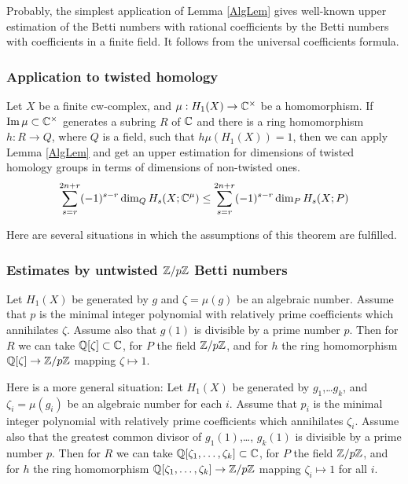 \documentclass{article}
\numberwithin{equation}{section}
\begin{document}
Probably, the simplest application of Lemma \ref{AlgLem} gives
well-known upper estimation of the Betti numbers with rational
coefficients by the Betti numbers with coefficients in a finite field. 
It follows from the universal coefficients formula. 

\subsubsection{Application to twisted homology}\label{sT.3.3} 
\begin{ATh}\label{EstTwHom}
Let $X$ be a finite cw-complex, and $\mu:H_1(X)\to\mathbb C^\times$ be a
homomorphism. If $\operatorname{Im}\mu\subset\mathbb C^\times$ generates a subring $R$ of $\mathbb C$ and
there is a ring homomorphism $h:R\to Q$, where $Q$ is a field, such that
$h\mu(H_1(X))=1$, then we can apply Lemma \ref{AlgLem} and get an upper
estimation for dimensions of twisted homology groups in terms of dimensions of
non-twisted ones.
\begin{equation}\label{twHomEst}
 \sum_{s=r}^{2n+r}(-1)^{s-r}\dim_QH_s(X;\mathbb C^\mu)\le
 \sum_{s=r}^{2n+r}(-1)^{s-r}\dim_PH_s(X;P) 
\end{equation}
\end{ATh} 

Here are several situations in which the assumptions of this theorem 
are fulfilled.

\subsubsection{Estimates by untwisted $\mathbb Z/p\mathbb Z$ Betti numbers}\label{sT.3.4} 
Let $H_1(X)$ be generated by $g$ and 
$\zeta=\mu(g)$ be an algebraic number.  Assume that $p$ is 
the minimal integer polynomial with relatively prime coefficients
which annihilates $\zeta$. Assume also that  $g(1)$ is divisible 
by a prime number $p$.
Then for $R$ we can take
$\mathbb Q[\zeta]\subset\mathbb C$, for $P$ the field $\mathbb Z/p\mathbb Z$, and for $h$ 
the ring homomorphism 
$\mathbb Q[\zeta]\to\mathbb Z/p\mathbb Z$ mapping $\zeta\mapsto1$.  

Here is a more general situation: Let $H_1(X)$ be generated by 
$g_1$,\dots $g_k$, and 
$\zeta_i=\mu(g_i)$ be an algebraic number for each $i$.  Assume that $p_i$ is 
the minimal integer polynomial with relatively prime coefficients
which annihilates $\zeta_i$. Assume also that the greatest common
divisor of $g_1(1)$,\dots, $g_k(1)$ is divisible by a prime number $p$.
Then for $R$ we can take
 $\mathbb Q[\zeta_1,\dots,\zeta_k]\subset\mathbb C$, for $P$ the field $\mathbb Z/p\mathbb Z$, and for $h$ 
the ring homomorphism 
$\mathbb Q[\zeta_1,\dots,\zeta_k]\to\mathbb Z/p\mathbb Z$ mapping $\zeta_i\mapsto1$ for all
$i$.   
\end{document}
